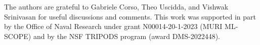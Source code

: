 The authors are grateful to Gabriele Corso, Theo Uscidda, and Vishwak Srinivasan for useful discussions and comments. This work was supported in part by the Office of Naval Research under
grant N00014-20-1-2023 (MURI ML-SCOPE) and by the NSF TRIPODS program (award DMS-2022448).